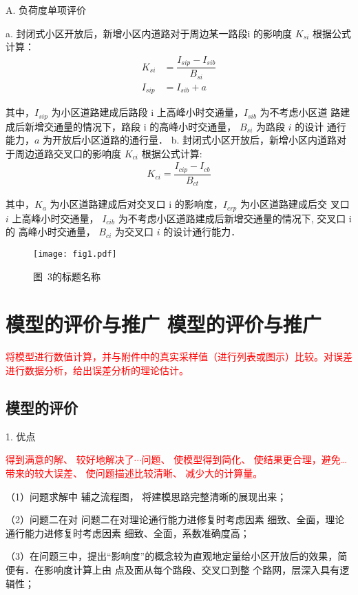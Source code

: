 \documentclass[12pt,a4paper]{nmmcm}
\begin{document}
A. 负荷度单项评价

a. 封闭式小区开放后，新增小区内道路对于周边某一路段i 的影响度 $K_{si}$
根据公式计算：
\begin{align}
  K_{s i}   & =\dfrac{I_{s i p}-I_{s i b}}{B_{s i}} \\
  I_{s i p} & =I_{s i b}+a
\end{align}

其中，$I _{sip}$ 为小区道路建成后路段 i 上高峰小时交通量，$I _{sib}$ 为不考虑小区道
路建成后新增交通量的情况下，路段 i 的高峰小时交通量，  $B_{s i}$  为路段 $i$ 的设计
通行能力，$a$ 为开放后小区道路的通行量．
b. 封闭式小区开放后，新增小区内道路对于周边道路交叉口的影响度  $K_{c i}$
根据公式计算:
\begin{align}
  K_{c i}=\dfrac{I_{c i p}-I_{c b}}{B_{c t}}
\end{align}


其中，$K_a$ 为小区道路建成后对交叉口 i 的影响度，$I_{crp}$ 为小区道路建成后交 叉口 $i$
上高峰小时交通量， $ I_{c i b}$  为不考虑小区道路建成后新增交通量的情况下, 交叉口 i 的
高峰小时交通量，  $B_{c i}$  为交叉口 $i$ 的设计通行能力．


\begin{figure}[h!t]
  \centerline{\texttt{[image: fig1.pdf]}}
  \caption{\song\wuhao 图~3的标题名称}
\end{figure}


\section{模型的评价与推广 模型的评价与推广}

\textcolor{red}{将模型进行数值计算，并与附件中的真实采样值（进行列表或图示）比较。对误差进行数据分析，给出误差分析的理论估计。}

\subsection{模型的评价}


1. 优点

\textcolor{red}{得到满意的解、
  较好地解决了$\cdots$问题、
  使模型得到简化、
  使结果更合理，避免…带来的较大误差、
  使问题描述比较清晰、
  减少大的计算量。
}

（1）问题求解中 辅之流程图， 将建模思路完整清晰的展现出来；

（2）问题二在对 问题二在对理论通行能力进修复时考虑因素 细致、全面，理论通行能力进修复时考虑因素
细致、全面，系数准确度高；

（3）在问题三中，提出“影响度”的概念较为直观地定量给小区开放后的效果，简便有．在影响度计算上由
点及面从每个路段、交叉口到整 个路网，层深入具有逻辑性；
\end{document}
